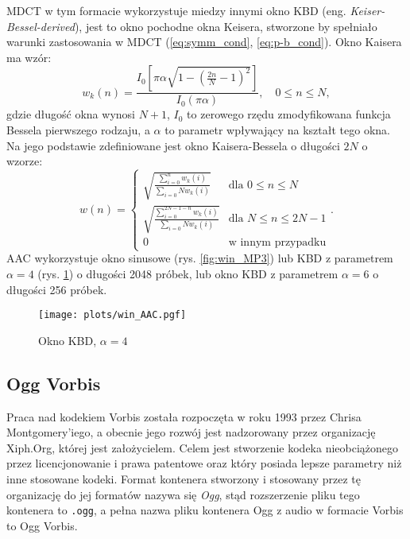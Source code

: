 \documentclass[pl,12pt]{aghdpl}
\let\Oldsubsection\subsection%
\renewcommand{\subsection}{\FloatBarrier\Oldsubsection}
\begin{document}
MDCT w tym formacie wykorzystuje miedzy innymi okno KBD (eng.
\textit{Keiser-Bessel-derived}), jest to okno pochodne okna Keisera, stworzone
by spełniało warunki zastosowania w MDCT (\ref{eq:symm_cond},
\ref{eq:p-b_cond}). Okno Kaisera ma wzór:
\begin{equation}\label{eq:kaiser_win}
  w_k(n) = \frac{I_0\left[\pi\alpha\sqrt{1-\left(\frac{2n}{N}-1\right)^2}\right]}
  {I_0(\pi\alpha)},\quad 0 \leq n \leq N,
\end{equation}
gdzie długość okna wynosi $N+1$, $I_0$ to zerowego rzędu zmodyfikowana funkcja
Bessela pierwszego rodzaju, a $\alpha$ to parametr wpływający na kształt tego
okna. Na jego podstawie zdefiniowane jest okno Kaisera-Bessela o długości $2N$
o wzorze:
\begin{equation}\label{eq:kbd_win}
  w(n) = \begin{cases}
    \sqrt{\frac{\sum_{i=0}^{n}w_k(i)}{\sum_{i=0}{N}w_k(i)}} & \text{dla }0 \leq n \leq N \\
    \sqrt{\frac{\sum_{i=0}^{2N-1-n}w_k(i)}{\sum_{i=0}{N}w_k(i)}} & \text{dla }N \leq n \leq 2N-1 \\
    0 & \text{w innym przypadku}
  \end{cases}.
\end{equation}
AAC wykorzystuje okno sinusowe (rys. \ref{fig:win_MP3}) lub KBD z parametrem
$\alpha = 4$ (rys.  \ref{fig:win_AAC}) o długości 2048 próbek, lub okno KBD z
parametrem $\alpha = 6$ o długości 256 próbek.

\begin{figure}[!tbh]
  \centering
  \texttt{[image: plots/win\_AAC.pgf]}
  \caption{Okno KBD, $\alpha = 4$}
  \label{fig:win_AAC}
\end{figure}

\subsection{Ogg Vorbis}

Praca nad kodekiem Vorbis została rozpoczęta w roku 1993 przez Chrisa
Montgomery'iego, a obecnie jego rozwój jest nadzorowany przez organizację
Xiph.Org, której jest założycielem. Celem jest stworzenie kodeka nieobciążonego
przez licencjonowanie i prawa patentowe oraz który posiada lepsze parametry niż
inne stosowane kodeki. Format kontenera stworzony i stosowany przez tę
organizację do jej formatów nazywa się \textit{Ogg}, stąd rozszerzenie pliku
tego kontenera to \lstinline|.ogg|, a pełna nazwa pliku kontenera Ogg z audio w
formacie Vorbis to Ogg Vorbis.
\end{document}
